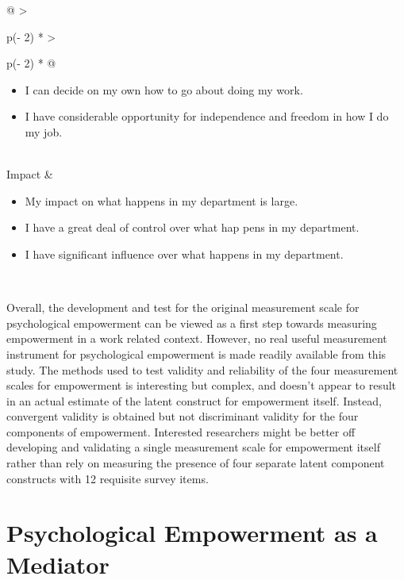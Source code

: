 \documentclass[
  11pt,
  a4paper,
]{article}
\providecommand{\tightlist}{%
  \setlength{\itemsep}{0pt}\setlength{\parskip}{0pt}}\usepackage{longtable,booktabs,array}
\begin{document}
\begin{longtable}[]{@{}
  >{\raggedright\arraybackslash}p{(\columnwidth - 2\tabcolsep) * }
  >{\raggedright\arraybackslash}p{(\columnwidth - 2\tabcolsep) * }@{}}
\begin{minipage}[t]{\linewidth}
\begin{itemize}
  I have significant autonomy in determining how I do my job.
\item
  I can decide on my own how to go about doing my work.
\item
  I have considerable opportunity for independence and freedom in how I
  do my job.
\end{itemize}
\end{minipage} \\
Impact & \begin{minipage}[t]{\linewidth}\raggedright
\begin{itemize}
\tightlist
\item
  My impact on what happens in my department is large.
\item
  I have a great deal of control over what hap pens in my department.
\item
  I have significant influence over what happens in my department.
\end{itemize}
\end{minipage} \\
\end{longtable}

Overall, the development and test for the original measurement scale for
psychological empowerment can be viewed as a first step towards
measuring empowerment in a work related context. However, no real useful
measurement instrument for psychological empowerment is made readily
available from this study. The methods used to test validity and
reliability of the four measurement scales for empowerment is
interesting but complex, and doesn't appear to result in an actual
estimate of the latent construct for empowerment itself. Instead,
convergent validity is obtained but not discriminant validity for the
four components of empowerment. Interested researchers might be better
off developing and validating a single measurement scale for empowerment
itself rather than rely on measuring the presence of four separate
latent component constructs with 12 requisite survey items.

\section{Psychological Empowerment as a
Mediator}\label{psychological-empowerment-as-a-mediator}
\end{document}
